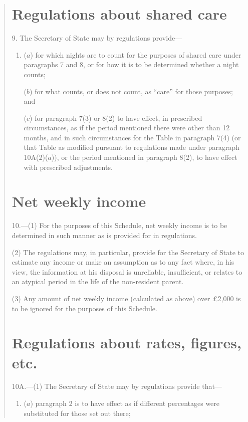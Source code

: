 \documentclass[12pt,a4paper]{article}
\begin{document}
\begin{quotation}
\section*{Regulations about shared care}

9. The Secretary of State may by regulations provide—
\begin{enumerate}\item[]
($a$) for which nights are to count for the purposes of shared care under paragraphs 7 and 8, or for how it is to be determined whether a night counts;

($b$) for what counts, or does not count, as “care” for those purposes; and

($c$) for paragraph 7(3)  or 8(2)  to have effect, in prescribed circumstances, as if the period mentioned there were other than 12 months, and in such circumstances for the Table in paragraph 7(4)  (or that Table as modified pursuant to regulations made under paragraph 10A(2)($a$)), or the period mentioned in paragraph 8(2), to have effect with prescribed adjustments.
\end{enumerate}

\section*{Net weekly income}

10.---(1) For the purposes of this Schedule, net weekly income is to be determined in such manner as is provided for in regulations.

(2) The regulations may, in particular, provide for the Secretary of State to estimate any income or make an assumption as to any fact where, in his view, the information at his disposal is unreliable, insufficient, or relates to an atypical period in the life of the non-resident parent.

(3) Any amount of net weekly income (calculated as above) over £2,000 is to be ignored for the purposes of this Schedule.

\section*{Regulations about rates, figures, etc.}

10A.---(1) The Secretary of State may by regulations provide that—
\begin{enumerate}\item[]
($a$) paragraph 2 is to have effect as if different percentages were substituted for those set out there;


\end{enumerate}
\end{quotation}
\end{document}
